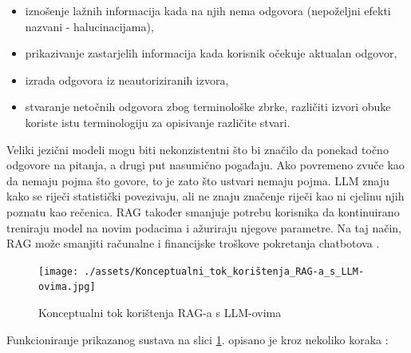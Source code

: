 \documentclass[]{foi}
\begin{document}
\begin{itemize}
    \item iznošenje lažnih informacija kada na njih nema odgovora (nepoželjni efekti nazvani - halucinacijama), 
    \item prikazivanje zastarjelih informacija kada korisnik očekuje aktualan odgovor,
    \item izrada odgovora iz neautoriziranih izvora,
    \item stvaranje netočnih odgovora zbog terminološke zbrke, različiti izvori obuke koriste istu terminologiju za opisivanje različite stvari.
\end{itemize}

Veliki jezični modeli mogu biti nekonzistentni što bi značilo da ponekad točno odgovore na pitanja, a drugi put nasumično pogađaju. Ako povremeno zvuče kao da nemaju pojma što govore, 
to je zato što ustvari nemaju pojma. LLM znaju kako se riječi statistički povezivaju, ali ne znaju značenje riječi kao ni cjelinu njih poznatu kao rečenica. RAG također smanjuje potrebu 
korisnika da kontinuirano treniraju model na novim podacima i ažuriraju njegove parametre. Na taj način, RAG može smanjiti računalne i financijske troškove pokretanja chatbotova \cite{ibmRAG}.

\newpage

\begin{figure}[ht!]
    \centering
    \texttt{[image: ./assets/Konceptualni\_tok\_korištenja\_RAG-a\_s\_LLM-ovima.jpg]} 
    \caption{Konceptualni tok korištenja RAG-a s LLM-ovima \cite{awsRAG2025}}
    \label{fig:slika1}
\end{figure}

Funkcioniranje prikazanog sustava na slici \ref{fig:slika1}. opisano je kroz nekoliko  koraka \cite{awsRAG2025}:
\end{document}

